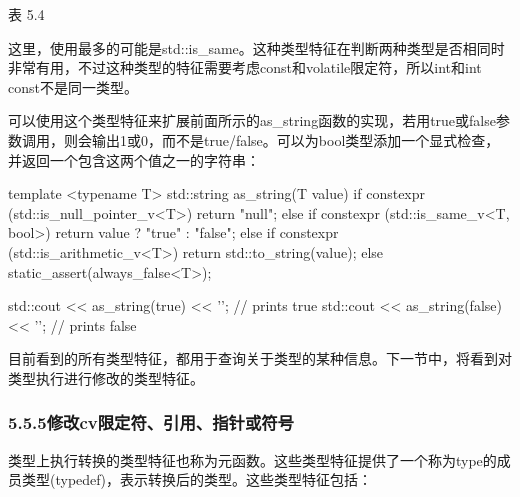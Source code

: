 \begin{center}
表 5.4
\end{center}

这里，使用最多的可能是std::is\_same。这种类型特征在判断两种类型是否相同时非常有用，不过这种类型的特征需要考虑const和volatile限定符，所以int和int const不是同一类型。

可以使用这个类型特征来扩展前面所示的as\_string函数的实现，若用true或false参数调用，则会输出1或0，而不是true/false。可以为bool类型添加一个显式检查，并返回一个包含这两个值之一的字符串：

\begin{cpp}
template <typename T>
std::string as_string(T value)
{
	if constexpr (std::is_null_pointer_v<T>)
		return "null";
	else if constexpr (std::is_same_v<T, bool>)
		return value ? "true" : "false";
	else if constexpr (std::is_arithmetic_v<T>)
		return std::to_string(value);
	else
		static_assert(always_false<T>);
}

std::cout << as_string(true) << '\n'; // prints true
std::cout << as_string(false) << '\n'; // prints false
\end{cpp}

目前看到的所有类型特征，都用于查询关于类型的某种信息。下一节中，将看到对类型执行进行修改的类型特征。

\subsubsection{5.5.5\hspace{0.2cm}修改cv限定符、引用、指针或符号}

类型上执行转换的类型特征也称为元函数。这些类型特征提供了一个称为type的成员类型(typedef)，表示转换后的类型。这些类型特征包括：

